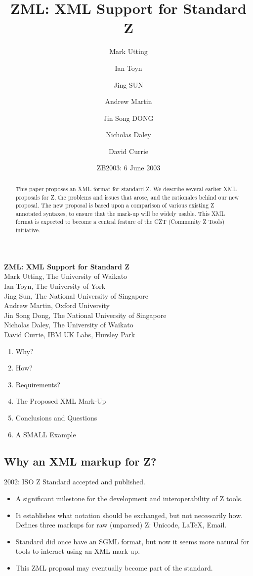 \documentclass[%
   slidesonly,%
   semhelv,%
   landscape]{seminar}
\date{ZB2003:  6 June 2003}
\title{ZML: XML Support for Standard Z}
\author{Mark Utting\inst{1} 
        \and Ian Toyn\inst{2}
        \and Jing SUN\inst{4}
        \and Andrew Martin\inst{3}
        \and Jin Song DONG\inst{4}
        \and Nicholas Daley\inst{1}
        \and David Currie\inst{5}
}
\begin{document}
\begin{slide}
  \begin{center}
{\large \textbf{ZML: XML Support for Standard Z}} \\[2ex]
{\small
Mark Utting, The University of Waikato \\
Ian Toyn, The University of York \\
Jing Sun, The National University of Singapore \\
Andrew Martin, Oxford University \\
Jin Song Dong, The National University of Singapore \\
Nicholas Daley, The University of Waikato \\
David Currie, IBM UK Labs, Hursley Park
}

\begin{enumerate}
\item Why?
\item How?
\item Requirements?
\item The Proposed XML Mark-Up
\item Conclusions and Questions
\item A SMALL Example
\end{enumerate}
  \end{center}
\end{slide}

\begin{abstract}
  This paper proposes an XML format for standard Z.
  We describe several earlier XML proposals for Z,
  the problems and issues that arose, and the rationales
  behind our new proposal.
  The new proposal is based upon a comparison of various existing Z
  annotated syntaxes, to ensure that the mark-up will be widely usable.
  This XML format is expected to become a central feature of
  the CZT (Community Z Tools) initiative.
\end{abstract}

\begin{slide}
\section{Why an XML markup for Z?}
  
2002: ISO Z Standard accepted and published.
\begin{itemize}
\item A significant milestone for the development and
  interoperability of Z tools.  
\item It establishes what notation should be exchanged, 
  but not necessarily how.  Defines three markups for raw (unparsed)
  Z:  Unicode, \LaTeX, Email.
\item Standard did once have an SGML format, but now it seems 
  more natural for tools to interact using an XML mark-up.
\item This ZML proposal may eventually become part of the standard.
\end{itemize}
\end{slide}
\end{document}
